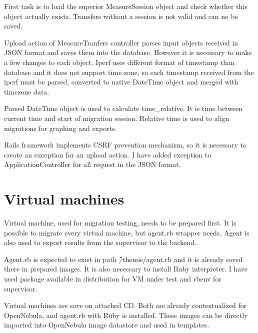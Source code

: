 First task is to load the superior MeasureSession object and check whether this object actually exists. Transfers without a session is not valid and can no be saved.

Upload action of MeasureTranfers controller parses input objects received in \Ac{JSON} format and saves them into the database. However it is necessary to make a few changes to each object. Iperf uses different format of timestamp than database and it does not support time zone, so each timestamp received from the iperf must be parsed, converted to native DateTime object and merged with timezone data. 

Parsed DateTime object is used to calculate time\_relative. It is time between current time and start of migration session. Relative time is used to align migrations for graphing and exports.

Rails framework implements \Ac{CSRF} prevention mechanism, so it is necessary to create an exception for an upload action. I have added exception to ApplicationController for all request in the \Ac{JSON} format.


\section{Virtual machines}
Virtual machine, used for migration testing, needs to be prepared first. It is possible to migrate every virtual machine, but agent.rb wrapper needs. Agent is also used to export results from the supervisor to the backend.

Agent.rb is expected to exist in path {\~/themis/agent.rb} and it is already saved there in prepared images. It is also necessary to install Ruby interpreter. I have used package available in distribution for \Ac{VM} under test and rbenv for supervisor.

Virtual machines are save on attached CD. Both are already contextualized for OpenNebula, and agent.rb with Ruby is installed. These images can be directly imported into OpenNebula image datastore and used in templates.

